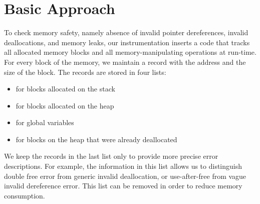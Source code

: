 \section{Basic Approach}\label{sec:basic}

To check memory safety, namely absence of invalid pointer dereferences, invalid
deallocations, and memory leaks, our instrumentation inserts a code that tracks
all allocated memory blocks and all memory-manipulating operations at run-time.
For every block of the memory, we maintain a record with the address and the size
of the block. The records are stored in four lists:
\begin{itemize}
  \item \stacklist for blocks allocated on the stack
  \item \heaplist for blocks allocated on the heap
  \item \globalslist for global variables
  \item \dealloclist for blocks on the heap that were already deallocated
\end{itemize}
We keep the records in the last list only to provide more precise
error descriptions. For example, the information in this list allows
us to distinguish double free error from generic invalid deallocation,
or use-after-free from vague invalid dereference error. This list can
be removed in order to reduce memory consumption.


